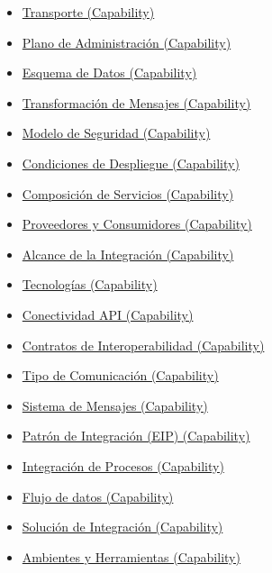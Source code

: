 \documentclass[
  paper=a4,
  ,captions=tableheading
]{scrartcl}
\providecommand{\tightlist}{%
  \setlength{\itemsep}{0pt}\setlength{\parskip}{0pt}}
\begin{document}
\begin{itemize}
  \begin{itemize}
  \tightlist
  \item
    \hyperref[transporte-capability]{Transporte (Capability)}
  \item
    \hyperref[plano-de-administraciuxf3n-capability]{Plano de
    Administración (Capability)}
  \item
    \hyperref[esquema-de-datos-capability]{Esquema de Datos
    (Capability)}
  \item
    \hyperref[transformaciuxf3n-de-mensajes-capability]{Transformación
    de Mensajes (Capability)}
  \item
    \hyperref[modelo-de-seguridad-capability]{Modelo de Seguridad
    (Capability)}
  \item
    \hyperref[condiciones-de-despliegue-capability]{Condiciones de
    Despliegue (Capability)}
  \item
    \hyperref[composiciuxf3n-de-servicios-capability]{Composición de
    Servicios (Capability)}
  \item
    \hyperref[proveedores-y-consumidores-capability]{Proveedores y
    Consumidores (Capability)}
  \item
    \hyperref[alcance-de-la-integraciuxf3n-capability]{Alcance de la
    Integración (Capability)}
  \item
    \hyperref[tecnologuxedas-capability]{Tecnologías (Capability)}
  \item
    \hyperref[conectividad-api-capability]{Conectividad API
    (Capability)}
  \item
    \hyperref[contratos-de-interoperabilidad-capability]{Contratos de
    Interoperabilidad (Capability)}
  \item
    \hyperref[tipo-de-comunicaciuxf3n-capability]{Tipo de Comunicación
    (Capability)}
  \item
    \hyperref[sistema-de-mensajes-capability]{Sistema de Mensajes
    (Capability)}
  \item
    \hyperref[patruxf3n-de-integraciuxf3n-eip-capability]{Patrón de
    Integración (EIP) (Capability)}
  \item
    \hyperref[integraciuxf3n-de-procesos-capability]{Integración de
    Procesos (Capability)}
  \item
    \hyperref[flujo-de-datos-capability]{Flujo de datos (Capability)}
  \item
    \hyperref[soluciuxf3n-de-integraciuxf3n-capability]{Solución de
    Integración (Capability)}
  \item
    \hyperref[ambientes-y-herramientas-capability]{Ambientes y
    Herramientas (Capability)}
  \end{itemize}
\end{itemize}
\end{document}
